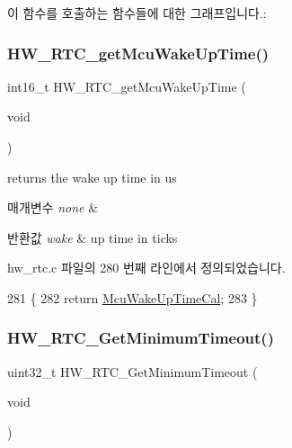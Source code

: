 이 함수를 호출하는 함수들에 대한 그래프입니다.\+:
\mbox{\label{group___lory_s_d_k___r_t_c___functions_ga62c900dca3a1beb9d4f2519664d3d274}} 
\subsubsection{\texorpdfstring{H\+W\+\_\+\+R\+T\+C\+\_\+get\+Mcu\+Wake\+Up\+Time()}{HW\_RTC\_getMcuWakeUpTime()}}
{\footnotesize\ttfamily int16\+\_\+t H\+W\+\_\+\+R\+T\+C\+\_\+get\+Mcu\+Wake\+Up\+Time (\begin{DoxyParamCaption}\item[{void}]{ }\end{DoxyParamCaption})}



returns the wake up time in us 


\begin{DoxyParams}{매개변수}
{\em none} & \\
\hline
\end{DoxyParams}

\begin{DoxyRetVals}{반환값}
{\em wake} & up time in ticks \\
\hline
\end{DoxyRetVals}


hw\+\_\+rtc.\+c 파일의 280 번째 라인에서 정의되었습니다.


\begin{DoxyCode}
281 \{
282   \textcolor{keywordflow}{return} \mbox{\hyperlink{hw__rtc_8c_a0d22e01d28d80ec5b4630686aec08e81}{McuWakeUpTimeCal}};
283 \}
\end{DoxyCode}
\mbox{\label{group___lory_s_d_k___r_t_c___functions_ga254f9e5c17daff978fef15be01021c51}} 
\subsubsection{\texorpdfstring{H\+W\+\_\+\+R\+T\+C\+\_\+\+Get\+Minimum\+Timeout()}{HW\_RTC\_GetMinimumTimeout()}}
{\footnotesize\ttfamily uint32\+\_\+t H\+W\+\_\+\+R\+T\+C\+\_\+\+Get\+Minimum\+Timeout (\begin{DoxyParamCaption}\item[{void}]{ }\end{DoxyParamCaption})}



